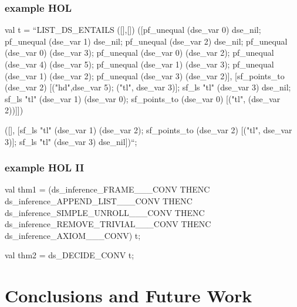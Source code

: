 \begin{frame}[fragile]
\frametitle{example HOL}
\begin{semiverbatim}\scriptsize
val t = ``LIST_DS_ENTAILS ([],[])
  ([pf_unequal (dse_var 0) dse_nil;
    pf_unequal (dse_var 1) dse_nil;
    pf_unequal (dse_var 2) dse_nil;
    pf_unequal (dse_var 0) (dse_var 3);
    pf_unequal (dse_var 0) (dse_var 2);
    pf_unequal (dse_var 4) (dse_var 5);
    pf_unequal (dse_var 1) (dse_var 3);
    pf_unequal (dse_var 1) (dse_var 2);
    pf_unequal (dse_var 3) (dse_var 2)],
   [sf_points_to (dse_var 2) [("hd",dse_var 5); ("tl", dse_var 3)];
    sf_ls "tl" (dse_var 3) dse_nil;
    sf_ls "tl" (dse_var 1) (dse_var 0);
    sf_points_to (dse_var 0) [("tl", (dse_var 2))]])

   ([],
    [sf_ls "tl" (dse_var 1) (dse_var 2);
     sf_points_to (dse_var 2) [("tl", dse_var 3)];
     sf_ls "tl" (dse_var 3) dse_nil])``;
\end{semiverbatim}
\end{frame}

\begin{frame}[fragile]
\frametitle{example HOL II}
\begin{semiverbatim}\scriptsize
val thm1 =
(ds_inference_FRAME___CONV THENC
 ds_inference_APPEND_LIST___CONV THENC
 ds_inference_SIMPLE_UNROLL___CONV THENC
 ds_inference_REMOVE_TRIVIAL___CONV THENC
 ds_inference_AXIOM___CONV) t;

val thm2 = ds_DECIDE_CONV t;
\end{semiverbatim}
\end{frame}

\section{Conclusions and Future Work}
\subsection*{}

